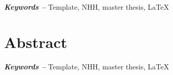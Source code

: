 \documentclass[../Main.tex]{subfiles}
\begin{document}
\lipsum[1-2] %


\par\vspace*{\fill} %
\textbf{\textit{Keywords --}} Template, NHH, master thesis, LaTeX %

\newpage
{} %
\section*{Abstract}

\lipsum[1-2] %


\par\vspace*{\fill} %
\textbf{\textit{Keywords --}} Template, NHH, master thesis, LaTeX %

\biblio %
\end{document}
